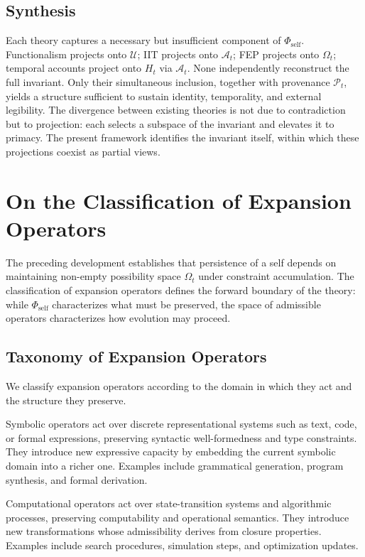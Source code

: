 \documentclass[12pt, a4paper]{article}
\theoremstyle{plain}
\theoremstyle{definition}
\theoremstyle{remark}
\begin{document}
\subsection{Synthesis}

Each theory captures a necessary but insufficient component of $\Phi_{\mathrm{self}}$. Functionalism projects onto $\mathcal{U}$; IIT projects onto $\mathcal{A}_t$; FEP projects onto $\Omega_t$; temporal accounts project onto $H_t$ via $\mathcal{A}_t$. None independently reconstruct the full invariant. Only their simultaneous inclusion, together with provenance $\mathcal{P}_t$, yields a structure sufficient to sustain identity, temporality, and external legibility. The divergence between existing theories is not due to contradiction but to projection: each selects a subspace of the invariant and elevates it to primacy. The present framework identifies the invariant itself, within which these projections coexist as partial views.

\section{On the Classification of Expansion Operators}

The preceding development establishes that persistence of a self depends on maintaining non-empty possibility space $\Omega_t$ under constraint accumulation. The classification of expansion operators defines the forward boundary of the theory: while $\Phi_{\mathrm{self}}$ characterizes what must be preserved, the space of admissible operators characterizes how evolution may proceed.

\subsection{Taxonomy of Expansion Operators}

We classify expansion operators according to the domain in which they act and the structure they preserve.

Symbolic operators act over discrete representational systems such as text, code, or formal expressions, preserving syntactic well-formedness and type constraints. They introduce new expressive capacity by embedding the current symbolic domain into a richer one. Examples include grammatical generation, program synthesis, and formal derivation.

Computational operators act over state-transition systems and algorithmic processes, preserving computability and operational semantics. They introduce new transformations whose admissibility derives from closure properties. Examples include search procedures, simulation steps, and optimization updates.
\end{document}
